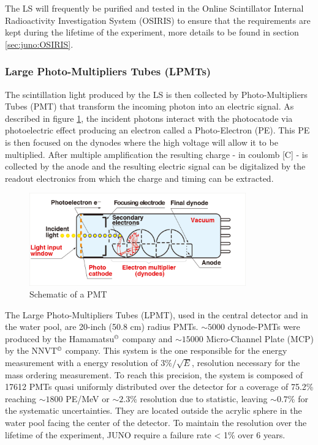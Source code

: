 The LS will frequently be purified and tested in the Online Scintillator Internal Radioactivity Investigation System (OSIRIS) \cite{juno_collaboration_design_2021} to ensure that the requirements are kept during the lifetime of the experiment, more details to be found in section \ref{sec:juno:OSIRIS}.

\subsubsection{Large Photo-Multipliers Tubes (LPMTs)}
\label{sec:juno:LPMT}

The scintillation light produced by the LS is then collected by Photo-Multipliers Tubes (PMT) that transform the incoming photon into an electric signal. As described in figure \ref{fig:juno:pmt-schem}, the incident photons interact with the photocatode via photoelectric effect producing an electron called a Photo-Electron (PE). This PE is then focused on the dynodes where the high voltage will allow it to be multiplied. After multiple amplification the resulting charge - in coulomb [C] - is collected by the anode and the resulting electric signal can be digitalized by the readout electronics from which the charge and timing can be extracted.

\begin{figure}[ht]
  \centering
  \includegraphics[height=4cm]{images/juno/pmt_schematic.png}
  \caption{Schematic of a PMT}
  \label{fig:juno:pmt-schem}
\end{figure}

The Large Photo-Multipliers Tubes (LPMT), used in the central detector and in the water pool, are 20-inch (50.8 cm) radius PMTs. $\sim 5000$ dynode-PMTs \cite{noauthor_photomultiplier_nodate} were produced by the Hamamatsu$^{\copyright}$ company and $\sim 15000$ Micro-Channel Plate (MCP) \cite{abusleme_mass_2022} by the NNVT$^{\copyright}$ company. This system is the one responsible for the energy measurement with a energy resolution of $3\%/\sqrt{E}$, resolution necessary for the mass ordering measurement. To reach this precision, the system is composed of 17612 PMTs quasi uniformly distributed over the detector for a coverage of 75.2\% reaching $\sim 1800$ PE/MeV or $\sim 2.3 \%$ resolution due to statistic, leaving $\sim 0.7\%$ for the systematic uncertainties. They are located outside the acrylic sphere in the water pool facing the center of the detector.
To maintain the resolution over the lifetime of the experiment, JUNO require a failure rate < 1\% over 6 years.


